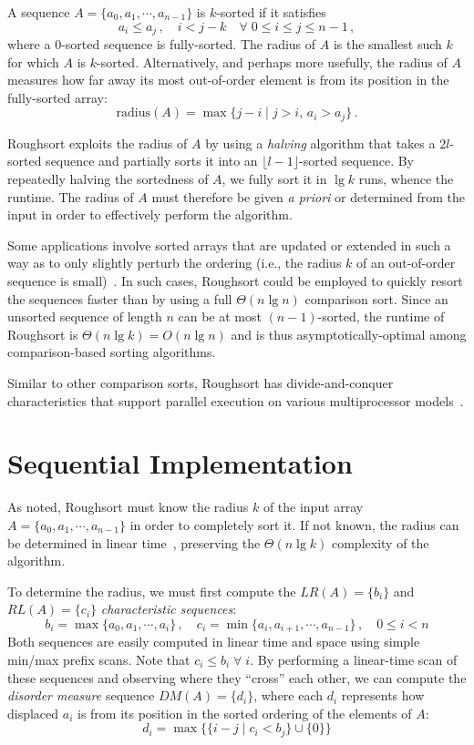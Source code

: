 \documentclass[letterpaper, 12pt]{article}
\let\supercite\cite
\renewcommand{\cite}[1]{\textnormal{~\supercite{#1}}}
\begin{document}
A sequence $A = \{a_0, a_1, \cdots, a_{n-1}\}$ is $k$-sorted if it satisfies
$$a_i \leq a_j \,,\quad i < j - k \quad\forall\; 0 \leq i \leq j \leq n-1\,,$$
where a 0-sorted sequence is fully-sorted.
The radius of $A$ is the smallest such $k$ for which $A$ is $k$-sorted.
Alternatively, and perhaps more usefully, the radius of $A$ measures how far away its most out-of-order element is from its
  position in the fully-sorted array:
$$\text{radius}(A) = \max\{j - i \mid j > i,\, a_i > a_j \} \,.$$

Roughsort exploits the radius of $A$ by using a \textit{halving} algorithm that takes a $2l$-sorted sequence and partially
  sorts it into an $\lfloor l - 1 \rfloor$-sorted sequence.
By repeatedly halving the sortedness of $A$, we fully sort it in $\lg k$ runs, whence the runtime.
The radius of $A$ must therefore be given \textit{a priori} or determined from the input
  in order to effectively perform the algorithm.

Some applications involve sorted arrays that are updated or extended in such a way as to only slightly perturb the ordering
  (i.e., the radius $k$ of an out-of-order sequence is small)\cite{altman89}.
In such cases, Roughsort could be employed to quickly resort the sequences faster than by using a full $\Theta(n \lg n)$
  comparison sort.
Since an unsorted sequence of length $n$ can be at most $(n - 1)$-sorted, the runtime of Roughsort is
  $\Theta(n \lg k) = O(n \lg n)$ and is thus asymptotically-optimal among comparison-based sorting algorithms.

Similar to other comparison sorts, Roughsort has divide-and-conquer characteristics that support parallel execution on various
  multiprocessor models\cite{altman89, altman90}.

\section{Sequential Implementation}
As noted, Roughsort must know the radius $k$ of the input array $A = \{a_0, a_1, \cdots, a_{n-1}\}$
  in order to completely sort it.
If not known, the radius can be determined in linear time\cite{altman89}, preserving the $\Theta(n \lg k)$ complexity of the
  algorithm.

To determine the radius, we must first compute the $LR(A) = \{b_i\}$ and $RL(A) = \{c_i\}$ \textit{characteristic sequences}:
$$b_i = \max\{a_0, a_1, \cdots, a_i\}\,, \quad c_i = \min\{a_i, a_{i+1}, \cdots, a_{n-1}\}\,, \quad 0 \leq i < n$$
Both sequences are easily computed in linear time and space using simple min/max prefix scans.
Note that $c_i \leq b_i \;\forall\; i$.
By performing a linear-time scan of these sequences and observing where they ``cross'' each other, we can compute
  the \textit{disorder measure} sequence $DM(A) = \{d_i\}$, where each $d_i$ represents how displaced $a_i$ is from its position
  in the sorted ordering of the elements of $A$:
$$d_i = \max\big\{\{i - j \mid c_i < b_j\} \cup \{0\} \big\}$$
\end{document}
